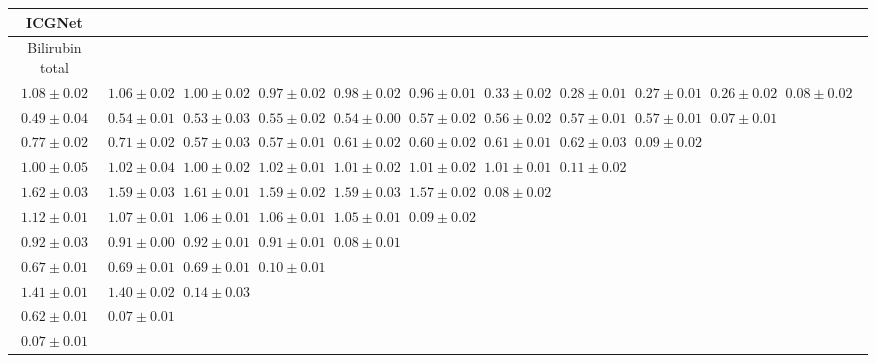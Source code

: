 \begin{table}[ht]
{{\begin{adjustbox}{width=\textwidth}
\begin{tabular}{cccccccccccc}
\hline
ICGNet &  &  &  &  &  &  &  &  &  & \\
\hline
Bilirubin total &  &  &  &  &  &  &  &  &  & \\
\hline
$1.08 \pm 0.02$ & $1.06 \pm 0.02$ & $1.00 \pm 0.02$ & $0.97 \pm 0.02$ & $0.98 \pm 0.02$ & $0.96 \pm 0.01$ & $0.33 \pm 0.02$ & $0.28 \pm 0.01$ & $0.27 \pm 0.01$ & $0.26 \pm 0.02$ & $0.08 \pm 0.02$ &  \\
$0.49 \pm 0.04$ & $0.54 \pm 0.01$ & $0.53 \pm 0.03$ & $0.55 \pm 0.02$ & $0.54 \pm 0.00$ & $0.57 \pm 0.02$ & $0.56 \pm 0.02$ & $0.57 \pm 0.01$ & $0.57 \pm 0.01$ & $0.07 \pm 0.01$ &  &  \\
$0.77 \pm 0.02$ & $0.71 \pm 0.02$ & $0.57 \pm 0.03$ & $0.57 \pm 0.01$ & $0.61 \pm 0.02$ & $0.60 \pm 0.02$ & $0.61 \pm 0.01$ & $0.62 \pm 0.03$ & $0.09 \pm 0.02$ &  &  &  \\
$1.00 \pm 0.05$ & $1.02 \pm 0.04$ & $1.00 \pm 0.02$ & $1.02 \pm 0.01$ & $1.01 \pm 0.02$ & $1.01 \pm 0.02$ & $1.01 \pm 0.01$ & $0.11 \pm 0.02$ &  &  &  &  \\
$1.62 \pm 0.03$ & $1.59 \pm 0.03$ & $1.61 \pm 0.01$ & $1.59 \pm 0.02$ & $1.59 \pm 0.03$ & $1.57 \pm 0.02$ & $0.08 \pm 0.02$ &  &  &  &  &  \\
$1.12 \pm 0.01$ & $1.07 \pm 0.01$ & $1.06 \pm 0.01$ & $1.06 \pm 0.01$ & $1.05 \pm 0.01$ & $0.09 \pm 0.02$ &  &  &  &  &  &  \\
$0.92 \pm 0.03$ & $0.91 \pm 0.00$ & $0.92 \pm 0.01$ & $0.91 \pm 0.01$ & $0.08 \pm 0.01$ &  &  &  &  &  &  &  \\
$0.67 \pm 0.01$ & $0.69 \pm 0.01$ & $0.69 \pm 0.01$ & $0.10 \pm 0.01$ &  &  &  &  &  &  &  &  \\
$1.41 \pm 0.01$ & $1.40 \pm 0.02$ & $0.14 \pm 0.03$ &  &  &  &  &  &  &  &  &  \\
$0.62 \pm 0.01$ & $0.07 \pm 0.01$ &  &  &  &  &  &  &  &  &  &  \\
$0.07 \pm 0.01$ &  &  &  &  &  &  &  &  &  &  &  \\



\end{tabular}
\end{adjustbox}}}
\end{table}
